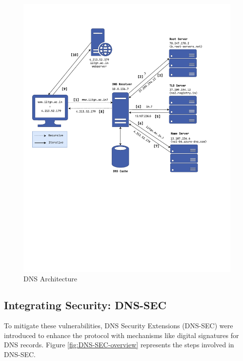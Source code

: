 \documentclass[conference]{IEEEtran}
\begin{document}
\begin{figure}[htbp]
    \centering
    \includegraphics[width=1\linewidth,trim={0 10cm 0 2cm},clip]{images/dns-overview.pdf}
    \caption{DNS Architecture}
    \label{fig:dns-overview}
\end{figure}

\subsection{Integrating Security: DNS-SEC}
To mitigate these vulnerabilities, DNS Security Extensions (DNS-SEC) were introduced to enhance the protocol with mechanisms like digital signatures for DNS records. Figure \ref{fig:DNS-SEC-overview} represents the steps involved in DNS-SEC. 
\end{document}
